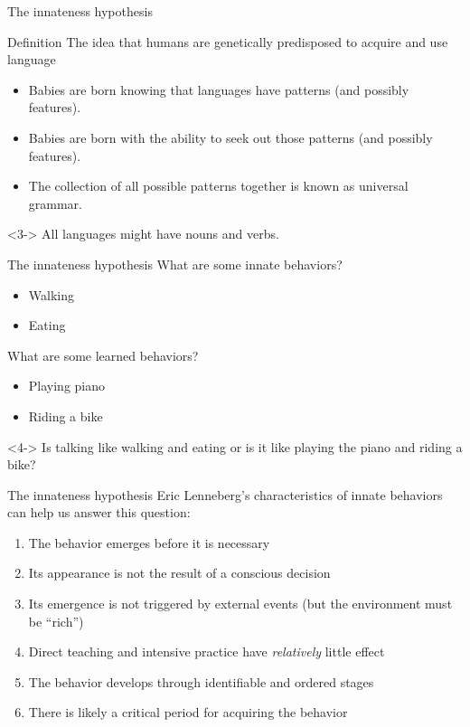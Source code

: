 \documentclass{beamer}
\begin{document}
        \begin{frame}{The innateness hypothesis}
            \begin{block}{Definition}
                The idea that humans are genetically predisposed to acquire and use language
            \end{block}
            \begin{itemize}
                \item<2-> Babies are born knowing that languages have patterns (and possibly features).
                \item<2-> Babies are born with the ability to seek out those patterns (and possibly features).
                \item<2-> The collection of all possible patterns together is known as \alert{universal grammar}.
            \end{itemize}
            \begin{example}<3->
                All languages might have nouns and verbs.
            \end{example}
        \end{frame}
        \begin{frame}{The innateness hypothesis}
            What are some innate behaviors?
            \begin{itemize}
                \item<2-> Walking
                \item<2-> Eating
            \end{itemize}
            What are some learned behaviors?
            \begin{itemize}
                \item<3-> Playing piano
                \item<3-> Riding a bike
            \end{itemize}
            \begin{alertblock}<4->{}
                Is talking like walking and eating or is it like playing the piano and riding a bike?
            \end{alertblock}
        \end{frame}
        \begin{frame}{The innateness hypothesis}
            Eric Lenneberg's characteristics of innate behaviors can help us answer this question:
            \begin{enumerate}
                \item The behavior emerges before it is necessary
                \item<2-> Its appearance is not the result of a conscious decision
                \item<3-> Its emergence is not triggered by external events (but the environment must be ``rich'')
                \item<4-> Direct teaching and intensive practice have \emph{relatively} little effect
                \item<5-> The behavior develops through identifiable and ordered stages
                \item<6-> There is likely a \alert{critical period} for acquiring the behavior
            \end{enumerate}
        \end{frame}
\end{document}
